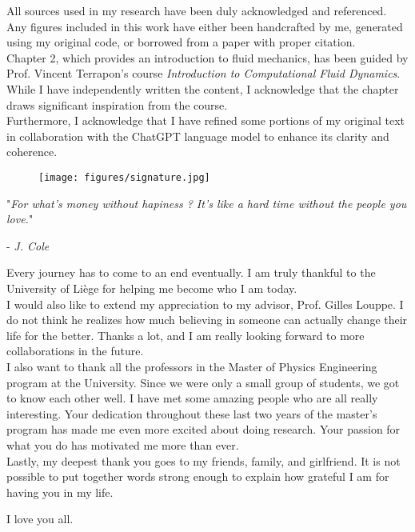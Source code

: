 All sources used in my research have been duly acknowledged and referenced. Any figures included in this work have either been handcrafted by me, generated using my original code, or borrowed from a paper with proper citation.\\

Chapter 2, which provides an introduction to fluid mechanics, has been guided by Prof. Vincent Terrapon's course \textit{Introduction to Computational Fluid Dynamics}. While I have independently written the content, I acknowledge that the chapter draws significant inspiration from the course.\\

Furthermore, I acknowledge that I have refined some portions of my original text in collaboration with the ChatGPT language model to enhance its clarity and coherence.

\vspace{1cm}
\begin{figure}[H]
	\hspace{7cm}
	\centering
	\texttt{[image: figures/signature.jpg]}
\end{figure}

\newpage

"\textit{For what's money without hapiness ? It's like a hard time without the people you love.}"\begin{flushright} -\textit{ J. Cole}\end{flushright}

\vspace{0.5cm}

Every journey has to come to an end eventually. I am truly thankful to the University of Liège for helping me become who I am today.\\

I would also like to extend my appreciation to my advisor, Prof. Gilles Louppe. I do not think he realizes how much believing in someone can actually change their life for the better. Thanks a lot, and I am really looking forward to more collaborations in the future.\\

I also want to thank all the professors in the Master of Physics Engineering program at the University. Since we were only a small group of students, we got to know each other well. I have met some amazing people who are all really interesting. Your dedication throughout these last two years of the master's program has made me even more excited about doing research. Your passion for what you do has motivated me more than ever.\\

Lastly, my deepest thank you goes to my friends, family, and girlfriend. It is not possible to put together words strong enough to explain how grateful I am for having you in my life.\\

\vspace{0.3cm}

I love you all.



